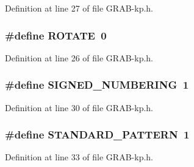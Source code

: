 Definition at line 27 of file G\-R\-A\-B-\/kp.\-h.

\hypertarget{_g_r_a_b-kp_8h_ae38c87f421906975bf7500c3b779fbd1}{
\subsubsection[{R\-O\-T\-A\-T\-E}]{\setlength{\rightskip}{0pt plus 5cm}\#define R\-O\-T\-A\-T\-E~0}}\label{_g_r_a_b-kp_8h_ae38c87f421906975bf7500c3b779fbd1}


Definition at line 26 of file G\-R\-A\-B-\/kp.\-h.

\hypertarget{_g_r_a_b-kp_8h_a591937bc56bfef3fd4e606da1e9bb6e1}{
\subsubsection[{S\-I\-G\-N\-E\-D\-\_\-\-N\-U\-M\-B\-E\-R\-I\-N\-G}]{\setlength{\rightskip}{0pt plus 5cm}\#define S\-I\-G\-N\-E\-D\-\_\-\-N\-U\-M\-B\-E\-R\-I\-N\-G~1}}\label{_g_r_a_b-kp_8h_a591937bc56bfef3fd4e606da1e9bb6e1}


Definition at line 30 of file G\-R\-A\-B-\/kp.\-h.

\hypertarget{_g_r_a_b-kp_8h_a5daa478426a73c9de86ceb44488ca3d8}{
\subsubsection[{S\-T\-A\-N\-D\-A\-R\-D\-\_\-\-P\-A\-T\-T\-E\-R\-N}]{\setlength{\rightskip}{0pt plus 5cm}\#define S\-T\-A\-N\-D\-A\-R\-D\-\_\-\-P\-A\-T\-T\-E\-R\-N~1}}\label{_g_r_a_b-kp_8h_a5daa478426a73c9de86ceb44488ca3d8}


Definition at line 33 of file G\-R\-A\-B-\/kp.\-h.

